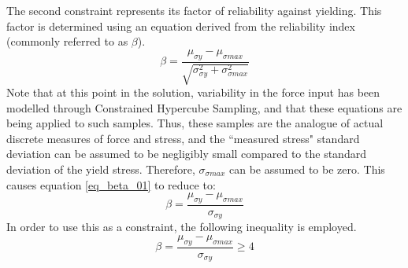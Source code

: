 The second constraint represents its factor of reliability against yielding. This factor is determined using an equation derived from the reliability index (commonly referred to as $\beta$).
\begin{equation}\label{eq_beta_01}
\beta = \frac{\mu_{\sigma y} - \mu_{\sigma max}}{\sqrt{\sigma_{\sigma y}^2 + \sigma_{\sigma max}^2}}
\end{equation}
Note that at this point in the solution, variability in the force input has been modelled through Constrained Hypercube Sampling, and that these equations are being applied to such samples. Thus, these samples are the analogue of actual discrete measures of force and stress, and the ``measured stress" standard deviation can be assumed to be negligibly small compared to the standard deviation of the yield stress. Therefore, $\sigma_{\sigma max}$ can be assumed to be zero. This causes equation \ref{eq_beta_01} to reduce to: 
\begin{equation}
\beta = \frac{\mu_{\sigma y} - \mu_{\sigma max}}{\sigma_{\sigma y}}
\end{equation}
In order to use this as a constraint, the following inequality is employed. 
\begin{equation}
\beta = \frac{\mu_{\sigma y} - \mu_{\sigma max}}{\sigma_{\sigma y}} \geq 4
\end{equation}